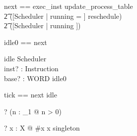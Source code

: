 \documentclass{article}
\begin{document}
\begin{zed}
  next == exec\_inst \pipe update\_process\_table \semi\\
    \t2 ([\Delta Scheduler | running = \emptyset] \land reschedule) \lor\\
    \t2 ([\Xi Scheduler | running \neq \emptyset])
\end{zed}

\begin{zed}
  idle0 == \lnot \pre next
\end{zed}

\begin{schema}{idle}
  \Xi Scheduler\\
  inst? : Instruction\\
  base? : WORD
\where
  idle0
\end{schema}

\begin{zed}
  tick == next \lor idle
\end{zed}

\begin{zed}
  \vdash? (\forall n : \nat_1 @ n > 0)
\end{zed}
\begin{zed}
  [X] \vdash? \forall x : \power X @ \#x  \iff x \in singleton
\end{zed}
\end{document}
